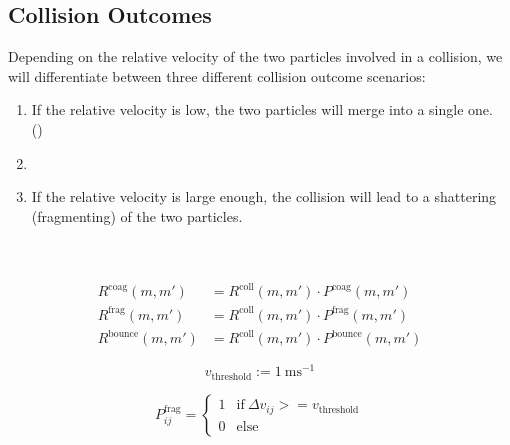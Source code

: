     \subsection{Collision Outcomes}

        Depending on the relative velocity of the two particles involved in a collision,
        we will differentiate between three different collision outcome scenarios:
        \begin{enumerate}
            \item If the relative velocity is low, the two particles will merge into a single one.
                \\ ()
            \item {}
            \item If the relative velocity is large enough, the collision will lead to a shattering 
                (fragmenting) of the two particles.
        \end{enumerate}

         \\
         \\

        \begin{align}
            R^\text{coag}(m,m')   &= R^\text{coll}(m,m') \cdot P^\text{coag}(m,m') \\
            R^\text{frag}(m,m')   &= R^\text{coll}(m,m') \cdot P^\text{frag}(m,m') \\
            R^\text{bounce}(m,m') &= R^\text{coll}(m,m') \cdot P^\text{bounce}(m,m')
        \end{align}

        \clearpage

        \begin{equation}
            v_\text{threshold}:=\SI{1}{\meter\second^{-1}}
        \end{equation}

        \begin{equation}
            P^\text{frag}_{ij}
            =
            \begin{cases}
                1 & \text{if}\ \Delta v_{ij} >= v_\text{threshold}\\
                0 & \text{else}
            \end{cases}
        \end{equation}
        
